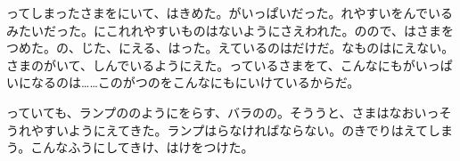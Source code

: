 ってしまったさまをにいて、はきめた。がいっぱいだった。れやすいをんでいるみたいだった。にこれれやすいものはないようにさえわれた。のので、はさまをつめた。の、じた、にえる、はった。えているのはだけだ。なものはにえない。さまのがいて、しんでいるようにえた。っているさまをて、こんなにもがいっぱいになるのは……このがつのをこんなにもにいけているからだ。

っていても、ランプののようにをらす、バラのの。そううと、さまはなおいっそうれやすいようにえてきた。ランプはらなければならない。のきでりはえてしまう。こんなふうにしてきけ、はけをつけた。


